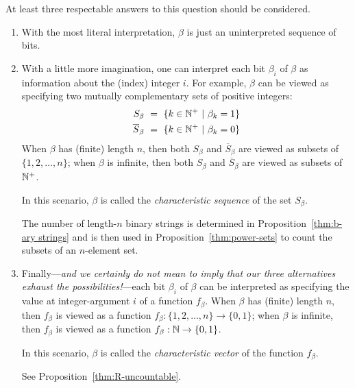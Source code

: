 \noindent
At least three respectable answers to this question should be
considered.
\begin{enumerate}
\item
With the most literal interpretation, $\beta$ is just an uninterpreted
sequence of bits.

\item
With a little more imagination, one can interpret each bit $\beta_i$
of $\beta$ as information about the (index) integer $i$.  For example,
$\beta$ can be viewed as specifying two mutually complementary sets of
positive integers:
\begin{eqnarray*}
S_\beta \ = \ \{ k \in \mathbb{N}^+ \ | \ \beta_k = 1\} \\
\overline{S}_\beta \ = \ \{ k \in \mathbb{N}^+ \ | \ \beta_k = 0\}
\end{eqnarray*}
When $\beta$ has (finite) length $n$, then both $S_\beta$ and
$\overline{S}_\beta$ are viewed as subsets of $\{1, 2, \ldots, n\}$;
when $\beta$ is infinite, then both $S_\beta$ and $\overline{S}_\beta$
are viewed as subsets of $\mathbb{N}^+$.

In this scenario, $\beta$ is called the {\it characteristic sequence}
of the set $S_\beta$.


\medskip


The number of length-$n$ binary strings is determined in
Proposition~\ref{thm:b-ary strings} and is then used in
Proposition~\ref{thm:power-sets} to count the subsets of an
$n$-element set.

\item
Finally---{\em and we certainly do not mean to imply that our three
  alternatives exhaust the possibilities!}---each bit $\beta_i$ of
$\beta$ can be interpreted as specifying the value at integer-argument
$i$ of a function $f_\beta$.  When $\beta$ has (finite) length $n$,
then $f_\beta$ is viewed as a function $f_\beta: \{1, 2, \ldots, n\}
\rightarrow \{0,1\}$; when $\beta$ is infinite, then $f_\beta$ is
viewed as a function $f_\beta: \mathbb{N} \rightarrow \{0,1\}$.

In this scenario, $\beta$ is called the {\it characteristic vector}
of the function $f_\beta$.

\medskip

  See Proposition~\ref{thm:R-uncountable}.

\end{enumerate}

